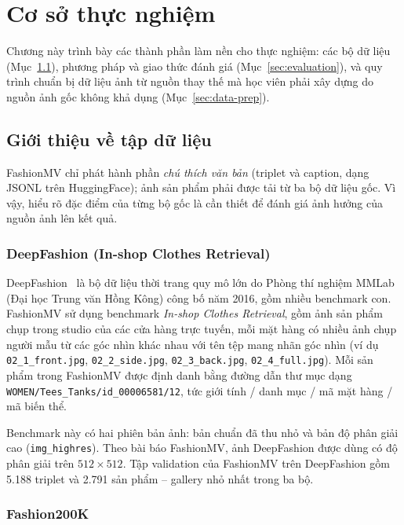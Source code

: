 \chapter{Cơ sở thực nghiệm}\label{chapter:experimental-basis}
\pagestyle{fancy}

Chương này trình bày các thành phần làm nền cho thực nghiệm: các bộ dữ liệu (Mục~\ref{sec:datasets}), phương pháp và giao thức đánh giá (Mục~\ref{sec:evaluation}), và quy trình chuẩn bị dữ liệu ảnh từ nguồn thay thế mà học viên phải xây dựng do nguồn ảnh gốc không khả dụng (Mục~\ref{sec:data-prep}).

\section{Giới thiệu về tập dữ liệu}\label{sec:datasets}

FashionMV chỉ phát hành phần \emph{chú thích văn bản} (triplet và caption, dạng JSONL trên HuggingFace); ảnh sản phẩm phải được tải từ ba bộ dữ liệu gốc. Vì vậy, hiểu rõ đặc điểm của từng bộ gốc là cần thiết để đánh giá ảnh hưởng của nguồn ảnh lên kết quả.

\subsection{DeepFashion (In-shop Clothes Retrieval)}

DeepFashion~\cite{liu2016deepfashion} là bộ dữ liệu thời trang quy mô lớn do Phòng thí nghiệm MMLab (Đại học Trung văn Hồng Kông) công bố năm 2016, gồm nhiều benchmark con. FashionMV sử dụng benchmark \emph{In-shop Clothes Retrieval}, gồm ảnh sản phẩm chụp trong studio của các cửa hàng trực tuyến, mỗi mặt hàng có nhiều ảnh chụp người mẫu từ các góc nhìn khác nhau với tên tệp mang nhãn góc nhìn (ví dụ \texttt{02\_1\_front.jpg}, \texttt{02\_2\_side.jpg}, \texttt{02\_3\_back.jpg}, \texttt{02\_4\_full.jpg}). Mỗi sản phẩm trong FashionMV được định danh bằng đường dẫn thư mục dạng \texttt{WOMEN/Tees\_Tanks/id\_00006581/12}, tức giới tính / danh mục / mã mặt hàng / mã biến thể.

Benchmark này có hai phiên bản ảnh: bản chuẩn đã thu nhỏ và bản độ phân giải cao (\texttt{img\_highres}). Theo bài báo FashionMV, ảnh DeepFashion được dùng có độ phân giải trên $512 \times 512$. Tập validation của FashionMV trên DeepFashion gồm 5.188 triplet và 2.791 sản phẩm -- gallery nhỏ nhất trong ba bộ.

\subsection{Fashion200K}

